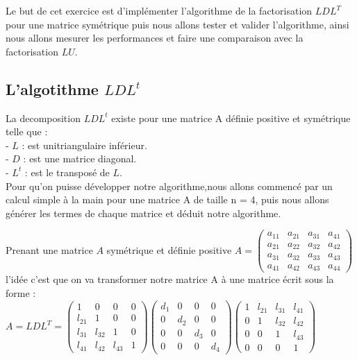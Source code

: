 \documentclass[12pt]{report}
\begin{document}
Le but de cet exercice est d'implémenter l'algorithme de la factorisation $LDL^T$ pour une matrice symétrique puis nous allons tester et valider l'algorithme, ainsi nous allons mesurer les performances et faire une comparaison avec la factorisation $LU$.

\subsection{L'algotithme $LDL^t$}

La decomposition $LDL^t$ existe pour une matrice A définie positive et symétrique telle que :\\
- $L$ : est unitriangulaire inférieur.\\
- $D$ : est une matrice diagonal.\\
- $L^t$ : est le transposé de $L$.\\

Pour qu'on puisse développer notre algorithme,nous allons commencé par un calcul simple à la main pour une matrice A de taille n = 4, puis nous allons générer les termes de chaque matrice et déduit notre algorithme.

Prenant une matrice $A$ symétrique et définie positive 
$A=\left(\begin{array}{llll}a_{11} & a_{21} & a_{31} & a_{41} \\ a_{21} & a_{22} & a_{32} & a_{42} \\ a_{31} & a_{32} & a_{33} & a_{43} \\ a_{41} & a_{42} & a_{43} & a_{44}\end{array}\right)$\\[0.5cm]
l'idée c'est que on va transformer notre matrice A à une matrice écrit sous la forme :\\[0.5cm]
$A=L D L^{T}=\left(\begin{array}{cccc}1 & 0 & 0 & 0 \\ l_{21} & 1 & 0 & 0 \\ l_{31} & l_{32} & 1 & 0 \\ l_{41} & l_{42} & l_{43} & 1\end{array}\right)\left(\begin{array}{cccc}d_{1} & 0 & 0 & 0 \\ 0 & d_{2} & 0 & 0 \\ 0 & 0 & d_{3} & 0 \\ 0 & 0 & 0 & d_{4}\end{array}\right)\left(\begin{array}{cccc}1 & l_{21} & l_{31} & l_{41} \\ 0 & 1 & l_{32} & l_{42} \\ 0 & 0 & 1 & l_{43} \\ 0 & 0 & 0 & 1\end{array}\right)$\\[0.3cm]
\end{document}
